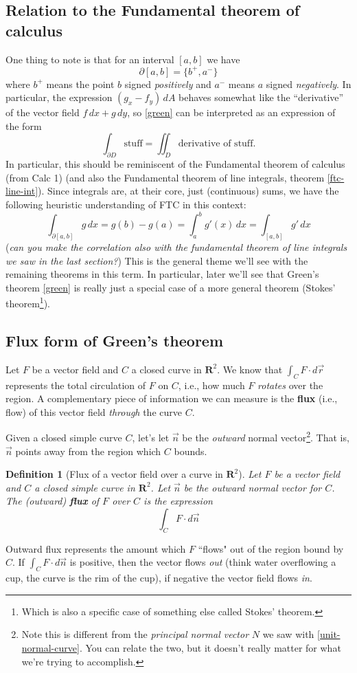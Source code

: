 \documentclass[12pt]{article}
\numberwithin{equation}{subsection}
\numberwithin{figure}{subsection}
\newtheorem{defn}[subsection]{Definition}
\theoremstyle{note}
\begin{document}
{\subsection{Relation to the Fundamental theorem of calculus}One thing to note is that for an interval $[a,b]$ we have \[\partial [a,b]=\{ b^+, a^-\}\] where $b^+$ means the point $b$ signed \textit{positively} and $a^-$ means $a$ signed \textit{negatively}. In particular, the expression $(g_x-f_y)\, dA$ behaves somewhat like the ``derivative'' of the vector field $f\,dx+g\,dy$, so \eqref{green} can be interpreted as an expression of the form \[ \int_{\partial D} \text{stuff} = \iint_D \text{derivative of stuff}.\] 
In particular, this should be reminiscent of the Fundamental theorem of calculus (from Calc 1) (and also the Fundamental theorem of line integrals, theorem \ref{ftc-line-int}). Since integrals are, at their core, just (continuous) sums, we have the following heuristic understanding of FTC in this context:
\[ \int_{\partial [a,b]} g\,dx =g(b)-g(a)=\int_a^b g'(x)\,dx= \int_{[a,b]}g'\,dx \]
(\textit{can you make the correlation also with the fundamental theorem of line integrals we saw in the last section?}) This is the general theme we'll see with the remaining theorems in this term. In particular, later we'll see that Green's theorem \eqref{green} is really just a special case of a more general theorem (Stokes' theorem\footnote{Which is also a specific case of something else called Stokes' theorem.}).


\subsection{Flux form of Green's theorem} \label{flux-form-greens}
Let $F$ be a vector field and $C$ a closed curve in $\mathbf{R}^2$. We know that $ \int_C F \cdot d\vec{r}$ represents the total circulation of $F$ on $C$, i.e., how much $F$ \textit{rotates} over the region. A complementary piece of information we can measure is the \textbf{flux} (i.e., flow) of this vector field \textit{through} the curve $C$. 

Given a closed simple curve $C$, let's let $\vec{n}$ be the \textit{outward} normal vector\footnote{Note this is different from the \textit{principal normal vector} $N$ we saw with \eqref{unit-normal-curve}. You can relate the two, but it doesn't really matter for what we're trying to accomplish.}. That is, $\vec{n}$ points away from the region which $C$ bounds. 
\begin{defn}[Flux of a vector field over a curve in $\mathbf{R}^2$]
	Let $F$ be a vector field and $C$ a closed simple curve in $\mathbf{R}^2$. Let $\vec{n}$ be the outward normal vector for $C$. The (outward) \textbf{flux} of $F$ over $C$ is the expression \begin{equation} \int_C F\cdot d\vec{n} \end{equation}
\end{defn}
Outward flux represents the amount which $F$ ``flows" out of the region bound by $C$. If $\int_C F\cdot d\vec{n}$ is positive, then the vector flows \textit{out} (think water overflowing a cup, the curve is the rim of the cup), if negative the vector field flows \textit{in}.

}
\end{document}
